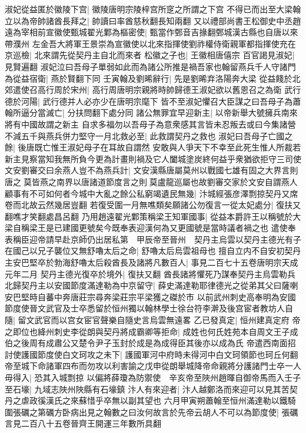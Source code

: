 淑妃從益匿於徽陵下宫|{
	徽陵唐明宗陵梓宫所窆之所謂之下宫}
不得已而出至大梁翰立以為帝帥諸酋長拜之|{
	帥讀曰率酋慈秋翻長知兩翻}
又以禮部尚書王松御史中丞趙遠為宰相前宣徽使甄城翟光鄴為樞密使|{
	甄當作鄄音吉掾翻鄄城漢古縣也自唐以來帶濮州}
左金吾大將軍王景崇為宣徽使以北來指揮使劉祚權侍衛親軍都指揮使充在京巡檢|{
	北來謂先從契丹主自北而來者}
松徽之子也|{
	王徽相唐僖宗}
百官謁見淑妃|{
	見賢遍翻}
淑妃泣曰吾母子單弱如此而為諸公所推是禍吾家也翰留燕兵千人守諸門為從益宿衛|{
	燕於賢翻下同}
壬寅翰及劉晞辭行|{
	先是劉晞弃洛陽奔大梁}
從益餞於北郊遣使召高行周於宋州|{
	高行周唐明宗親將時帥歸德王淑妃欲以舊恩召之為衛}
武行德於河陽|{
	武行德并人必亦少在唐明宗麾下}
皆不至淑妃懼召大臣謀之曰吾母子為蕭翰所逼分當滅亡|{
	分扶問翻下處分同}
諸公無罪宜早迎新主|{
	以帝新舉大號擁兵南來將有中國故謂之新主}
自求多福勿以吾母子為意衆感其言皆未忍叛去或曰今集諸營不減五千與燕兵併力堅守一月北救必至|{
	此救謂契丹之救也}
淑妃曰吾母子亡國之餘|{
	後唐既亡惟王淑妃母子在耳故自謂然}
安敢與人爭天下不幸至此死生惟人所裁若新主見察當知我無所負今更為計畫則禍及它人闔城塗炭終何益乎衆猶欲拒守三司使文安劉審交曰余燕人豈不為燕兵計|{
	文安漢縣唐屬莫州以戰國七雄有固之大界言則唐之莫皆燕之南界以唐諸道節度言之則莫盧龍巡屬也故劉審交家於文安自謂燕人}
顧事有不可如何者今城中大亂之餘公私窮竭遺民無幾|{
	汴城經張彦澤剽掠契丹又席卷而北故云然幾居豈翻}
若復受圍一月無噍類矣願諸公勿復言一從太妃處分|{
	復扶又翻噍才笑翻處昌呂翻}
乃用趙遠翟光鄴策稱梁王知軍國事|{
	從益本爵許王以稱號於大梁自稱梁王是已建國更號矣今既奉表迎漢何為又更國號是當時議者禍之也}
遣使奉表稱臣迎帝請早赴京師仍出居私第　甲辰帝至晉州　契丹主烏雲以契丹主德光有子在國己以兄子襲位又無舒嚕太后之命|{
	舒嚕太后烏雲祖母也}
擅自立内不自安初契丹主安巴堅卒於勃海舒嚕太后殺酋長及諸將凡數百人|{
	事見二百七十五卷唐明宗天成元年二月}
契丹主德光復卒於境外|{
	復扶又翻}
酋長諸將懼死乃謀奉契丹主烏雲勒兵北歸契丹主以安國節度滿達勒為中京留守|{
	薛史滿達勒耶律德光之從弟其父曰薩喇安巴堅時自蕃中奔唐莊宗尋奔梁莊宗平梁獲之磔於市}
以前武州刺史高奉明為安國節度使晉文武官及士卒悉留於恒州獨以翰林學士徐台符李澣及後宫宦者教坊人自隨|{
	留文武官而以宫女宦官聲樂自隨史言烏雲無遠畧}
乙已發真定|{
	恒州建真定府}
帝之即位也絳州刺史李從朗與契丹將成霸卿等拒命|{
	成姓也何氏姓苑本自周文王子成伯之後周有成肅公又楚令尹子玉封於成是為成得臣其後亦以成為氏}
帝遣西南面招討使護國節度使白文珂攻之未下|{
	護國軍河中府時未得河中白文珂領節也珂丘何翻}
帝至城下命諸軍四布而勿攻以利害諭之戊申從朗舉城降帝命親將分護諸門士卒一人毋得入|{
	恐其入城剽掠}
以偏將薛瓊為防禦使　辛亥帝至陜州趙暉自御帝馬而入壬子至石壕|{
	九域志陜州陜縣有石壕鎮}
汴人有來迎者|{
	汴人越鄭洛而來迎可以見其苦契丹之虐政徯漢氏之來蘇惜乎卒無以副其望也}
六月甲寅朔蕭翰至恒州滿達勒以鐵騎圍張礪之第礪方卧病出見之翰數之曰汝何故言於先帝云胡人不可以為節度使|{
	張礪言見二百八十五卷晉齊王開運三年數所具翻}

